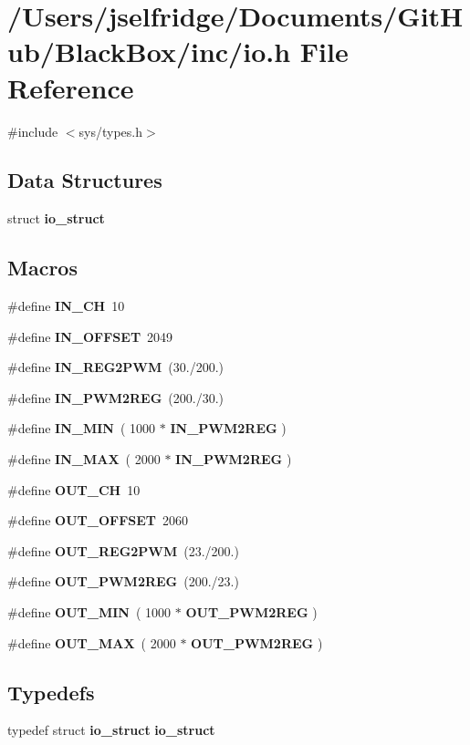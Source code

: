 \section{/\+Users/jselfridge/\+Documents/\+Git\+Hub/\+Black\+Box/inc/io.h File Reference}
\label{io_8h}
{\ttfamily \#include $<$sys/types.\+h$>$}\newline
\subsection*{Data Structures}
\begin{DoxyCompactItemize}
\item 
struct \textbf{ io\+\_\+struct}
\end{DoxyCompactItemize}
\subsection*{Macros}
\begin{DoxyCompactItemize}
\item 
\#define \textbf{ I\+N\+\_\+\+CH}~10
\item 
\#define \textbf{ I\+N\+\_\+\+O\+F\+F\+S\+ET}~2049
\item 
\#define \textbf{ I\+N\+\_\+\+R\+E\+G2\+P\+WM}~(30./200.)
\item 
\#define \textbf{ I\+N\+\_\+\+P\+W\+M2\+R\+EG}~(200./30.)
\item 
\#define \textbf{ I\+N\+\_\+\+M\+IN}~( 1000 $\ast$ \textbf{ I\+N\+\_\+\+P\+W\+M2\+R\+EG} )
\item 
\#define \textbf{ I\+N\+\_\+\+M\+AX}~( 2000 $\ast$ \textbf{ I\+N\+\_\+\+P\+W\+M2\+R\+EG} )
\item 
\#define \textbf{ O\+U\+T\+\_\+\+CH}~10
\item 
\#define \textbf{ O\+U\+T\+\_\+\+O\+F\+F\+S\+ET}~2060
\item 
\#define \textbf{ O\+U\+T\+\_\+\+R\+E\+G2\+P\+WM}~(23./200.)
\item 
\#define \textbf{ O\+U\+T\+\_\+\+P\+W\+M2\+R\+EG}~(200./23.)
\item 
\#define \textbf{ O\+U\+T\+\_\+\+M\+IN}~( 1000 $\ast$ \textbf{ O\+U\+T\+\_\+\+P\+W\+M2\+R\+EG} )
\item 
\#define \textbf{ O\+U\+T\+\_\+\+M\+AX}~( 2000 $\ast$ \textbf{ O\+U\+T\+\_\+\+P\+W\+M2\+R\+EG} )
\end{DoxyCompactItemize}
\subsection*{Typedefs}
\begin{DoxyCompactItemize}
\item 
typedef struct \textbf{ io\+\_\+struct} \textbf{ io\+\_\+struct}
\end{DoxyCompactItemize}
